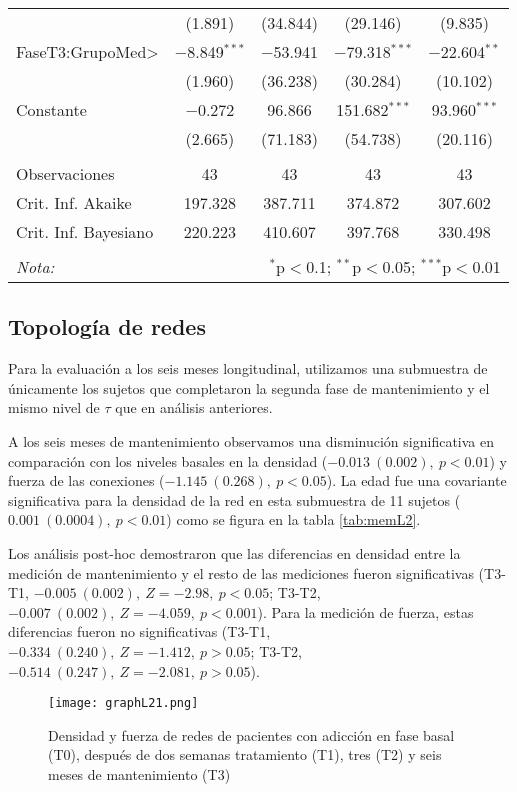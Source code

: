 \begin{table}[!hbtp]
\begin{tabular}{@{\extracolsep{5pt}}lcccc}
  & (1.891) & (34.844) & (29.146) & (9.835) \\
  FaseT3:GrupoMed\textgreater  & $-$8.849$^{***}$ & $-$53.941 & $-$79.318$^{***}$ & $-$22.604$^{**}$ \\
  & (1.960) & (36.238) & (30.284) & (10.102) \\
  Constante & $-$0.272 & 96.866 & 151.682$^{***}$ & 93.960$^{***}$ \\
  & (2.665) & (71.183) & (54.738) & (20.116) \\
 \hline \\[-1.8ex]
Observaciones & 43 & 43 & 43 & 43 \\
Crit. Inf. Akaike & 197.328 & 387.711 & 374.872 & 307.602 \\
Crit. Inf. Bayesiano & 220.223 & 410.607 & 397.768 & 330.498 \\
\hline
\hline \\[-1.8ex]
\textit{Nota:}  & \multicolumn{4}{r}{$^{*}$p$<$0.1; $^{**}$p$<$0.05; $^{***}$p$<$0.01} \\
\end{tabular}
\end{table}

\FloatBarrier
\subsection{Topología de redes}

Para la evaluación a los seis meses longitudinal, utilizamos una submuestra de únicamente los sujetos que completaron la segunda fase de mantenimiento y el mismo nivel de $\tau$ que en análisis anteriores.

A los seis meses de mantenimiento observamos una disminución significativa en comparación con los niveles basales en la densidad ($-0.013\ (0.002),\ p<0.01$) y fuerza de las conexiones ($-1.145\ (0.268),\ p<0.05$). La edad fue una covariante significativa para la densidad de la red en esta submuestra de 11 sujetos ($0.001\ (0.0004),\ p<0.01$) como se figura en la tabla \ref{tab:memL2}. \par
Los análisis post-hoc demostraron que las diferencias en densidad entre la medición de mantenimiento y el resto de las mediciones fueron significativas (T3-T1, $-0.005\ (0.002),\ Z=-2.98,\ p<0.05$; T3-T2, $-0.007\ (0.002),\ Z=-4.059,\ p<0.001$). Para la medición de fuerza, estas diferencias fueron no significativas (T3-T1, $-0.334\ (0.240),\ Z=-1.412,\ p>0.05$; T3-T2, $-0.514\ (0.247),\ Z=-2.081,\ p>0.05$).

\begin{figure}[!htb]
    \centering
    \texttt{[image: graphL21.png]}
    \caption{Densidad y fuerza de redes de pacientes con adicción en fase basal (T0), después de dos semanas tratamiento (T1), tres (T2) y seis meses de mantenimiento (T3)}
    \label{fig:gpL21}
\end{figure}

